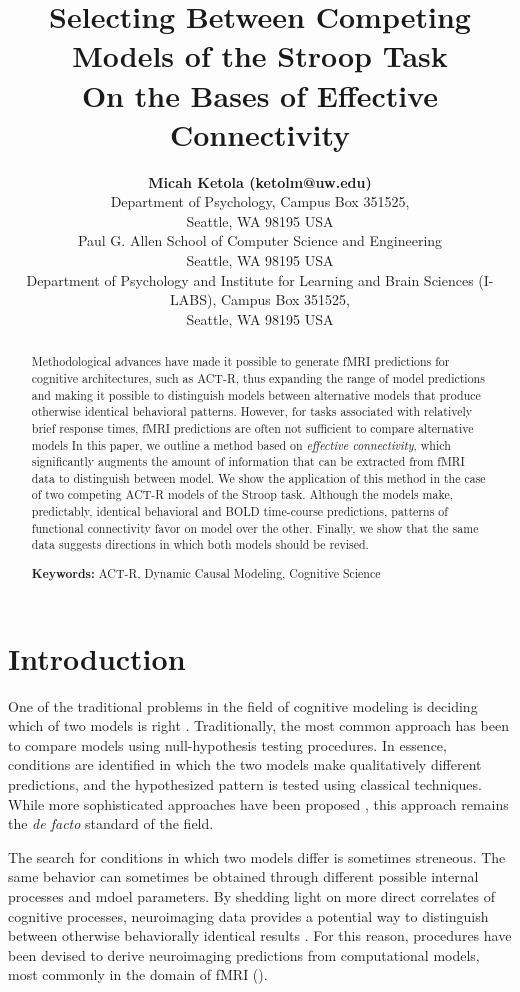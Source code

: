 \documentclass[10pt,letterpaper]{article}
\title{Selecting Between Competing Models of the Stroop Task \\ On the Bases of Effective Connectivity}
\author{{\large \bf Micah Ketola (ketolm@uw.edu)} \\
  Department of Psychology, Campus Box 351525, \\
  Seattle, WA 98195 USA
  \AND {\large \bf Linxing Preston Jiang (prestonj@cs.washington.edu)} \\
  Paul G. Allen School of Computer Science and Engineering\\
  Seattle, WA 98195 USA 
  \AND {\large \bf Andrea Stocco (stocco@uw.edu)} \\
  Department of Psychology and Institute for Learning and Brain Sciences (I-LABS), Campus Box 351525, \\
  Seattle, WA 98195 USA}
\begin{document}
\maketitle


\begin{abstract}
Methodological advances have made it possible to generate fMRI predictions for cognitive architectures, such as ACT-R, thus expanding the range of model predictions and making it possible to distinguish models between alternative models that produce otherwise identical behavioral patterns. However, for tasks associated with relatively brief response times, fMRI predictions are often not sufficient to compare alternative models In this paper, we outline a method based on {\it effective connectivity}, which significantly augments the amount of information that can be extracted from fMRI data to distinguish between model. We show the application of this method in the case of two competing ACT-R models of the Stroop task. Although the models make, predictably, identical behavioral and BOLD time-course predictions, patterns of functional connectivity favor on model over the other. Finally, we show that the same data suggests directions in which both models should be revised.

\textbf{Keywords:} 
ACT-R, Dynamic Causal Modeling, Cognitive Science
\end{abstract}

\section{Introduction}

One of the traditional problems in the field of cognitive modeling is deciding which of two models is right \cite{Pitt2006}. Traditionally, the most common approach has been to compare models using null-hypothesis testing procedures. In essence, conditions are identified in which the two models make qualitatively different predictions, and the hypothesized pattern is tested using classical techniques. While more sophisticated approaches have been proposed \cite{Pitt2006, Veksler2015}, this approach remains the {\it de facto} standard of the field.

The search for conditions in which two models differ is sometimes streneous. The same behavior can sometimes be obtained through different possible internal processes and mdoel parameters. By shedding light on more direct correlates of cognitive processes, neuroimaging data provides a potential way to distinguish between otherwise behaviorally identical results \cite{Sohn2004}. For this reason, procedures have been devised to derive neuroimaging predictions from computational models, most commonly in the domain of fMRI (\cite{Anderson2008}).
\end{document}
